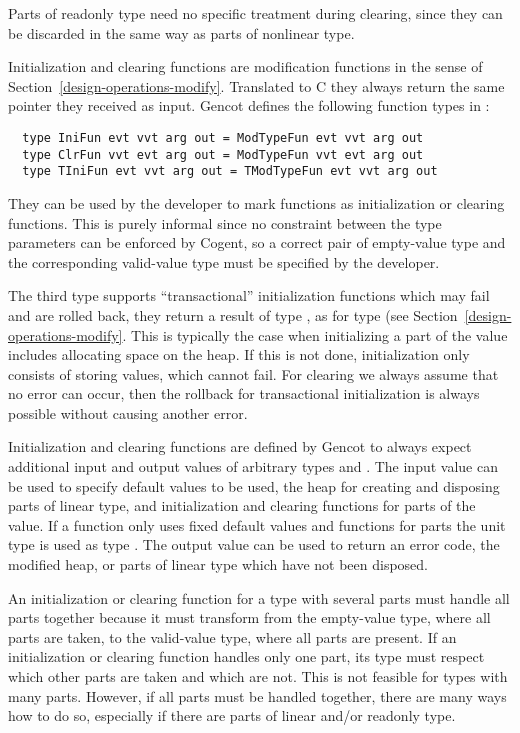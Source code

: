 Parts of readonly type need no specific treatment during clearing, since they can be discarded in the same way as
parts of nonlinear type.

Initialization and clearing functions are modification functions in the sense of Section~\ref{design-operations-modify}.
Translated to C they always return the same pointer they received as input.
Gencot defines the following function types in :
\begin{verbatim}
  type IniFun evt vvt arg out = ModTypeFun evt vvt arg out
  type ClrFun vvt evt arg out = ModTypeFun vvt evt arg out
  type TIniFun evt vvt arg out = TModTypeFun evt vvt arg out
\end{verbatim}
They can be used by the developer to mark functions as initialization or clearing functions. This is purely 
informal since no constraint between the type parameters can be enforced by Cogent, so a correct pair of 
empty-value type and the corresponding valid-value type must be specified by the developer.

The third type supports ``transactional'' initialization functions which may fail and are rolled back, they return
a result of type , as for type  (see Section~\ref{design-operations-modify}.
This is typically the case when initializing a part of the value includes allocating space on the heap.
If this is not done, initialization only consists of storing values, which cannot fail. For clearing we always 
assume that no error can occur, then the rollback for transactional initialization is always possible without 
causing another error.

Initialization and clearing functions are defined by Gencot to always expect additional input and output values of 
arbitrary types  and . The input value can be used to specify default values to be used,
the heap for creating and disposing parts of linear type, and initialization and clearing 
functions for parts of the value. If a function only uses fixed default values and functions for parts 
the unit type \code{()} is used as type . The output value can be used to return an error code,
the modified heap, or parts of linear type which have not been disposed.

An initialization or clearing function for a type with several parts must handle all parts together because it must
transform from the empty-value type, where all parts are taken, to the valid-value type, where all parts are present.
If an initialization or clearing function handles only one part, its type must respect which other parts are 
taken and which are not. This is not feasible for types with many parts. However, if all parts must be handled together,
there are many ways how to do so, especially if there are parts of linear and/or readonly type. 

